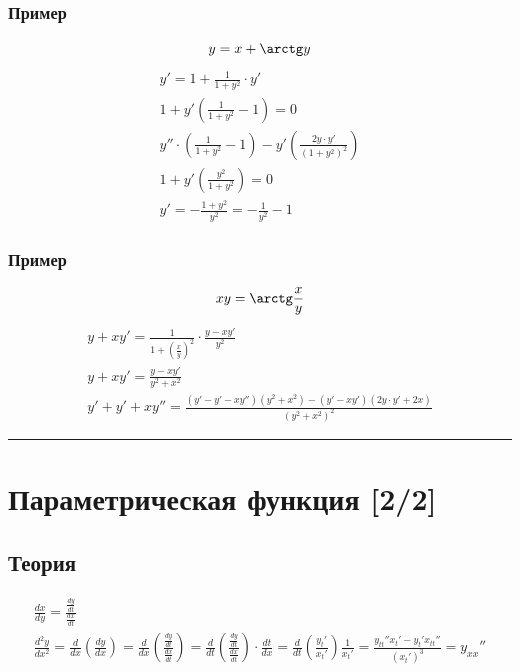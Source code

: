 \documentclass{article}
\begin{document}
\subsubsection{Пример}
\[
    y = x + \arctg y
\]
\begin{gather*}
    y' = 1 + \frac{1}{1 + y^2} \cdot y' \\
    1 + y' \left( \frac{1}{1 + y^2} - 1\right) = 0 \\
    y'' \cdot \left( \frac{1}{1 + y^2} - 1 \right) - y' \left( \frac{2y \cdot y'}{(1 + y^2)^2} \right) \\
    1 + y' \left( \frac{y^2}{1 + y^2} \right) = 0 \\
    y' = -\frac{1 + y^2}{y^2} = -\frac{1}{y^2} - 1
\end{gather*}

\subsubsection{Пример}
\[
    xy = \arctg \frac{x}{y}
\]
\begin{gather*}
    y + xy' = \frac{1}{1 + \left( \frac{x}{y} \right)^2} \cdot \frac{y - xy'}{y^2} \\
    y + xy' = \frac{y - xy'}{y^2 + x^2} \\
    y' + y' + xy'' = \frac{(y' - y' - xy'')(y^2 + x^2) - (y' - xy')(2y \cdot y' + 2x)}{(y^2 + x^2)^2}
\end{gather*}



\par\noindent\rule{\textwidth}{1pt}
\section{Параметрическая функция [2/2]}

\subsection{Теория}
\begin{gather*}
    \frac{dx}{dy} = \frac{\frac{dy}{dt}}{\frac{dx}{dt}} \\
    \frac{d^2y}{dx^2} = \frac{d}{dx} \left( \frac{dy}{dx} \right) =
    \frac{d}{dx} \left( \frac{\frac{dy}{dt}}{\frac{dx}{dt}} \right) =
    \frac{d}{dt} \left( \frac{\frac{dy}{dt}}{\frac{dx}{dt}} \right) \cdot \frac{dt}{dx} =
    \frac{d}{dt} \left( \frac{y_t'}{x_t'} \right) \frac{1}{x_t'} =
    \frac{y_{tt}'' x_t' - y_t' x_{tt}''}{(x_t')^3} = y_{xx}''
\end{gather*}
\end{document}
